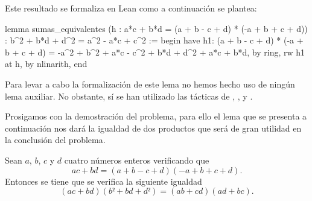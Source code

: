 Este resultado se formaliza en Lean como a continuación se plantea:
\begin{leancode}
lemma sumas_equivalentes
  (h : a*c + b*d = (a + b - c + d) * (-a + b + c + d))
  : b^2 + b*d + d^2 = a^2 - a*c + c^2 :=
begin
  have h1: (a + b - c + d) * (-a + b + c + d) =
           -a^2  + b^2  + a*c - c^2 + b*d + d^2 + a*c + b*d,
    by ring,
  rw h1 at h,
  by nlinarith,
end
\end{leancode}

Para levar a cabo la formalización de este lema no hemos hecho uso de
ningún lema auxiliar. No obstante, sí se han utilizado las tácticas de
,
,
 y 
.

Prosigamos con la demostración del problema, para ello el lema que se
presenta a continuación nos dará la igualdad de dos productos que será
de gran utilidad en la conclusión del problema.

\begin{lema}\label{q601lemaprod}
    Sean \(a\), \(b\), \(c\) y \(d\) cuatro números enteros verificando que 
    \begin{equation}\label{q601hipprod}\tag{h}
      ac+bd = (a+b-c+d)(-a+b+c+d).
    \end{equation}
    Entonces se tiene que se verifica la siguiente igualdad
    \begin{equation}\label{q601objprod}
      (ac+bd)(b²+bd+d²)=(ab+cd)(ad+bc).
    \end{equation}
\end{lema}

